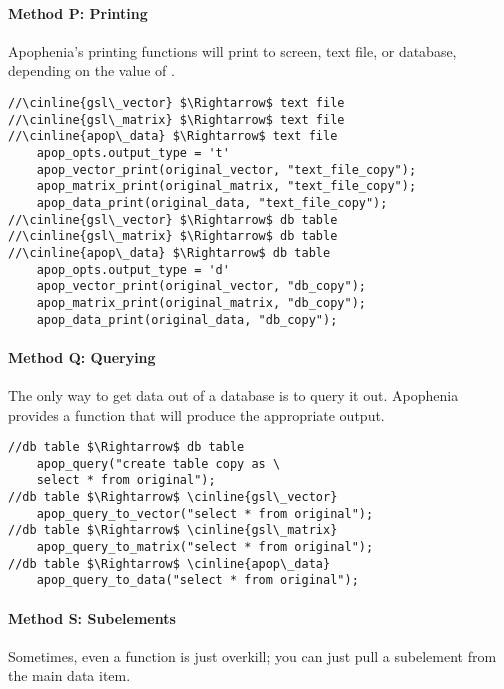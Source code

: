 \paragraph{Method P: Printing}
  
Apophenia's printing functions will print to screen, text file, or
database, depending on the value of .
\begin{lstlisting}
//\cinline{gsl\_vector} $\Rightarrow$ text file
//\cinline{gsl\_matrix} $\Rightarrow$ text file
//\cinline{apop\_data} $\Rightarrow$ text file
    apop_opts.output_type = 't'
    apop_vector_print(original_vector, "text_file_copy");
    apop_matrix_print(original_matrix, "text_file_copy");
    apop_data_print(original_data, "text_file_copy");
//\cinline{gsl\_vector} $\Rightarrow$ db table
//\cinline{gsl\_matrix} $\Rightarrow$ db table
//\cinline{apop\_data} $\Rightarrow$ db table
    apop_opts.output_type = 'd'
    apop_vector_print(original_vector, "db_copy");
    apop_matrix_print(original_matrix, "db_copy");
    apop_data_print(original_data, "db_copy");
\end{lstlisting}


\paragraph{Method Q: Querying}
 
 
The only way to get data out of a database is to query it out. Apophenia
provides a function that will produce the appropriate output.

\begin{lstlisting}
//db table $\Rightarrow$ db table
    apop_query("create table copy as \
    select * from original");
//db table $\Rightarrow$ \cinline{gsl\_vector}
    apop_query_to_vector("select * from original");
//db table $\Rightarrow$ \cinline{gsl\_matrix}
    apop_query_to_matrix("select * from original");
//db table $\Rightarrow$ \cinline{apop\_data}
    apop_query_to_data("select * from original");
\end{lstlisting}


\paragraph{Method S: Subelements} Sometimes, even a function is just
overkill; you can just pull a subelement from the main data item.

